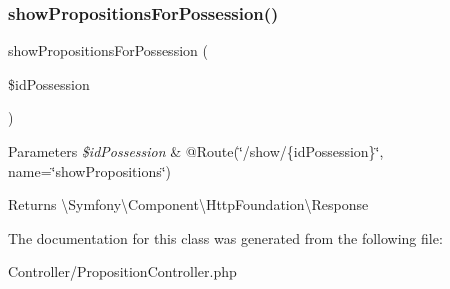 \subsubsection{\texorpdfstring{showPropositionsForPossession()}{showPropositionsForPossession()}}
{\footnotesize\ttfamily show\+Propositions\+For\+Possession (\begin{DoxyParamCaption}\item[{}]{\$id\+Possession }\end{DoxyParamCaption})}


\begin{DoxyParams}{Parameters}
{\em \$id\+Possession} & @\+Route(\char`\"{}/show/\{id\+Possession\}\char`\"{}, name=\char`\"{}show\+Propositions\char`\"{}) \\
\hline
\end{DoxyParams}
\begin{DoxyReturn}{Returns}
\textbackslash{}\+Symfony\textbackslash{}\+Component\textbackslash{}\+Http\+Foundation\textbackslash{}\+Response 
\end{DoxyReturn}


The documentation for this class was generated from the following file\+:\begin{DoxyCompactItemize}
\item 
Controller/Proposition\+Controller.\+php\end{DoxyCompactItemize}
